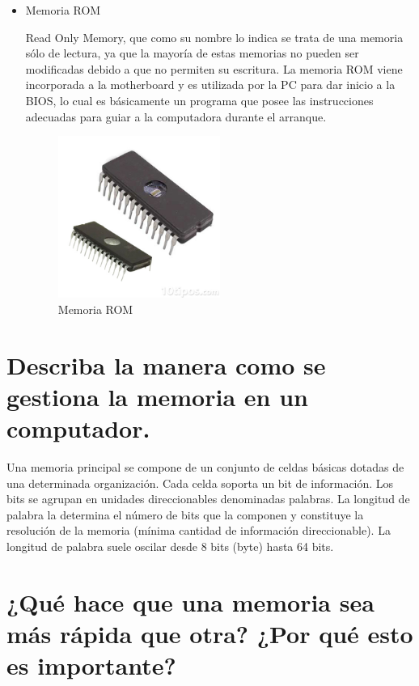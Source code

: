 \documentclass{article}
\begin{document}
\begin{itemize}
    \item Memoria ROM
    
    Read Only Memory, que como su nombre lo indica se trata de una memoria sólo de lectura, ya que la mayoría de estas memorias no pueden ser modificadas debido a que no permiten su escritura.
     La memoria ROM viene incorporada a la motherboard y es utilizada por la PC para dar inicio a la BIOS, lo cual es básicamente un programa que posee las instrucciones adecuadas para guiar a la computadora durante el arranque.

\begin{figure}[h]
    \centering
    \includegraphics[width=0.5\textwidth]{rom.jpg}
    \caption{Memoria ROM}
    \label{fig:rom}
\end{figure}

    \end{itemize}
    
\newpage

\section{Describa la manera como se gestiona la memoria en un computador.}

Una memoria principal se compone de un conjunto de celdas básicas dotadas de una
determinada organización. Cada celda soporta un bit de información. Los bits se agrupan en unidades
direccionables denominadas palabras. La longitud de palabra la determina el número de bits que la
componen y constituye la resolución de la memoria (mínima cantidad de información direccionable).
La longitud de palabra suele oscilar desde 8 bits (byte) hasta 64 bits. 

\section{¿Qué hace que una memoria sea más rápida que otra? ¿Por qué esto es importante?}
\end{document}
